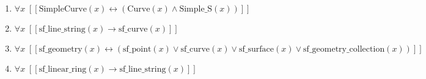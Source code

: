 \documentclass{article}
\begin{document}
\begin{enumerate}
\item $\forall x\;  \left[ \left[ \textrm{SimpleCurve}(x) \leftrightarrow \left(\textrm{Curve}(x) \land \textrm{Simple\_S}(x)\right) \right] \right]$
\item $\forall x\;  \left[ \left[ \textrm{sf\_line\_string}(x) \rightarrow \textrm{sf\_curve}(x) \right] \right]$
\item $\forall x\;  \left[ \left[ \textrm{sf\_geometry}(x) \leftrightarrow \left(\textrm{sf\_point}(x) \lor \textrm{sf\_curve}(x) \lor \textrm{sf\_surface}(x) \lor \textrm{sf\_geometry\_collection}(x)\right) \right] \right]$
\item $\forall x\;  \left[ \left[ \textrm{sf\_linear\_ring}(x) \rightarrow \textrm{sf\_line\_string}(x) \right] \right]$
\end{enumerate}
\end{document}
